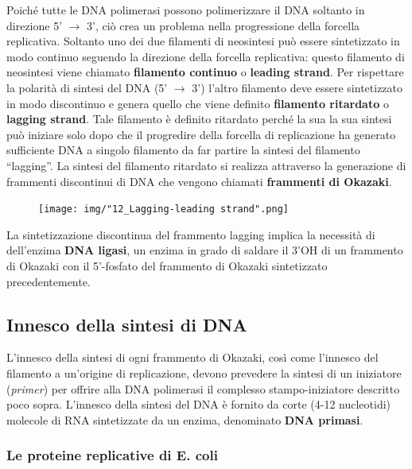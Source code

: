 \documentclass[11pt]{book}
\begin{document}
Poiché tutte le DNA polimerasi possono polimerizzare il DNA soltanto in
direzione 5' \(\rightarrow\) 3', ciò crea un problema nella progressione
della forcella replicativa. Soltanto uno dei due filamenti di neosintesi
può essere sintetizzato in modo continuo seguendo la direzione della
forcella replicativa: questo filamento di neosintesi viene chiamato
\textbf{filamento continuo} o \textbf{leading strand}. Per rispettare la
polarità di sintesi del DNA (5' \(\rightarrow\) 3') l'altro filamento
deve essere sintetizzato in modo discontinuo e genera quello che viene
definito \textbf{filamento ritardato} o \textbf{lagging strand}. Tale
filamento è definito ritardato perché la sua la sua sintesi può iniziare
solo dopo che il progredire della forcella di replicazione ha generato
sufficiente DNA a singolo filamento da far partire la sintesi del
filamento ``lagging''. La sintesi del filamento ritardato si realizza
attraverso la generazione di frammenti discontinui di DNA che vengono
chiamati \textbf{frammenti di Okazaki}.

\clearpage
\begin{figure}[htp]
\centering
\texttt{[image: img/"12\_Lagging-leading strand".png]}
\caption{}
\label{lagging-leading-strand}
\end{figure}

La sintetizzazione discontinua del frammento lagging implica la
necessità di dell'enzima \textbf{DNA ligasi}, un enzima in grado di
saldare il 3'OH di un frammento di Okazaki con il 5'-fosfato del
frammento di Okazaki sintetizzato precedentemente.

\subsection{Innesco della sintesi di
DNA}\label{innesco-della-sintesi-di-dna}

L'innesco della sintesi di ogni frammento di Okazaki, così come
l'innesco del filamento a un'origine di replicazione, devono prevedere
la sintesi di un iniziatore (\emph{primer}) per offrire alla DNA
polimerasi il complesso stampo-iniziatore descritto poco sopra.
L'innesco della sintesi del DNA è fornito da corte (4-12 nucleotidi)
molecole di RNA sintetizzate da un enzima, denominato \textbf{DNA
primasi}.

\clearpage
\subsubsection{Le proteine replicative di E.
coli}\label{le-proteine-replicative-di-e.-coli}
\end{document}
